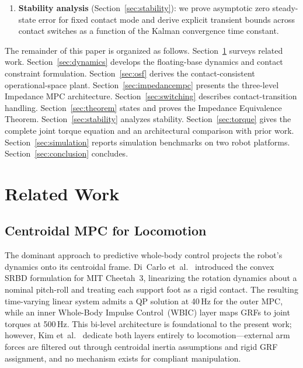 \begin{enumerate}
\item \textbf{Stability analysis} (Section~\ref{sec:stability}): we prove
asymptotic zero steady-state error for fixed contact mode and derive
explicit transient bounds across contact switches as a function of the
Kalman convergence time constant.
\end{enumerate}

The remainder of this paper is organized as follows.
Section~\ref{sec:related} surveys related work.
Section~\ref{sec:dynamics} develops the floating-base dynamics and contact
constraint formulation.
Section~\ref{sec:osf} derives the contact-consistent operational-space
plant.
Section~\ref{sec:impedancempc} presents the three-level Impedance MPC
architecture.
Section~\ref{sec:switching} describes contact-transition handling.
Section~\ref{sec:theorem} states and proves the Impedance Equivalence
Theorem.
Section~\ref{sec:stability} analyzes stability.
Section~\ref{sec:torque} gives the complete joint torque equation and an
architectural comparison with prior work.
Section~\ref{sec:simulation} reports simulation benchmarks on two robot
platforms.
Section~\ref{sec:conclusion} concludes.

\section{Related Work}\label{sec:related}

\subsection{Centroidal MPC for Locomotion}

The dominant approach to predictive whole-body control projects the robot's
dynamics onto its centroidal frame.
Di~Carlo et~al.~\cite{dicarlo2018dynamic} introduced the convex SRBD
formulation for MIT Cheetah~3, linearizing the rotation dynamics about a
nominal pitch-roll and treating each support foot as a rigid contact.
The resulting time-varying linear system admits a QP solution at 40\,Hz for
the outer MPC, while an inner Whole-Body Impulse Control~(WBIC) layer maps
GRFs to joint torques at 500\,Hz.
This bi-level architecture is foundational to the present work; however,
Kim et~al.~\cite{kim2019highly} dedicate both layers entirely to
locomotion---external arm forces are filtered out through centroidal inertia
assumptions and rigid GRF assignment, and no mechanism exists for compliant
manipulation.


